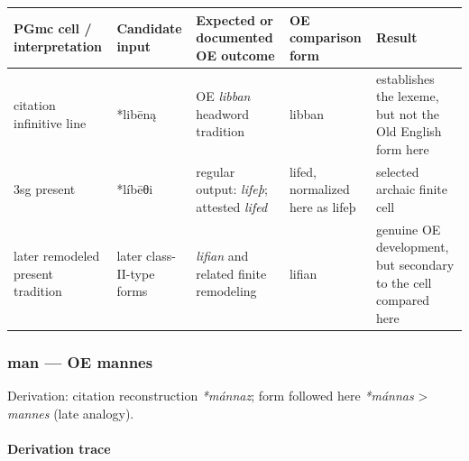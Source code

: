 \documentclass[
  british,
  a4paper,
]{article}
\newcounter{none} %
\begin{document}
{\def\LTcaptype{none} %
\begin{longtable}[]{@{}
  >{\raggedright\arraybackslash}p{}
  >{\raggedright\arraybackslash}p{}
  >{\raggedright\arraybackslash}p{}
  >{\raggedright\arraybackslash}p{}
  >{\raggedright\arraybackslash}p{}@{}}
\toprule\noalign{}
\begin{minipage}[b]{\linewidth}\raggedright
PGmc cell / interpretation
\end{minipage} & \begin{minipage}[b]{\linewidth}\raggedright
Candidate input
\end{minipage} & \begin{minipage}[b]{\linewidth}\raggedright
Expected or documented OE outcome
\end{minipage} & \begin{minipage}[b]{\linewidth}\raggedright
OE comparison form
\end{minipage} & \begin{minipage}[b]{\linewidth}\raggedright
Result
\end{minipage} \\
\midrule\noalign{}
\endhead
\bottomrule\noalign{}
\endlastfoot
citation infinitive line & *libēną & OE \emph{libban} headword tradition
& libban & establishes the lexeme, but not the Old English form here \\
3sg present & *líbēθi & regular output: \emph{lifeþ}; attested
\emph{lifed} & lifed, normalized here as lifeþ & selected archaic finite
cell \\
later remodeled present tradition & later class-II-type forms &
\emph{lifian} and related finite remodeling & lifian & genuine OE
development, but secondary to the cell compared here \\
\end{longtable}
}

\subsubsection{man --- OE mannes}\label{man-oe-mannes}

Derivation: citation reconstruction \emph{*mánnaz}; form followed here
\emph{*mánnas} \textgreater{} \emph{mannes} (late analogy).

\paragraph{Derivation trace}\label{derivation-trace-49}
\end{document}
